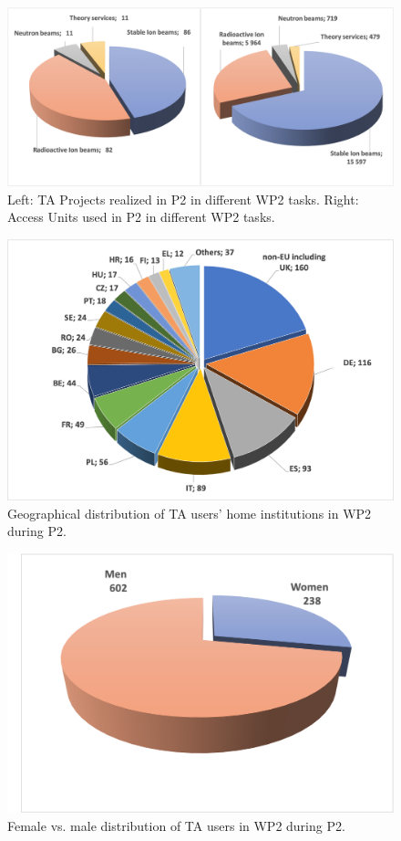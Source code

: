 \begin{figure}[!h]
    \centering
    \includegraphics[width=0.95\linewidth]{graphics/WP2_projects.png}
    \caption{Left: TA Projects realized in P2 in different WP2 tasks. Right: Access Units used in P2 in different WP2 tasks.}
    \label{fig:WP2_projects}
\end{figure}


\begin{figure}[!h]
    \centering
    \includegraphics[width=1.0\linewidth]{graphics/WP2_users_per_country.png}
    \caption{Geographical distribution of TA users' home institutions in WP2 during P2.}
    \label{fig:WP2_users_per_country}
\end{figure}

\begin{figure}[!h]
    \centering
    \includegraphics[width=0.6\linewidth]{graphics/WP2_users_men_women.png}
    \caption{Female vs. male distribution of TA users in WP2 during P2.}
    \label{fig:WP2_users_men_women}
\end{figure}


